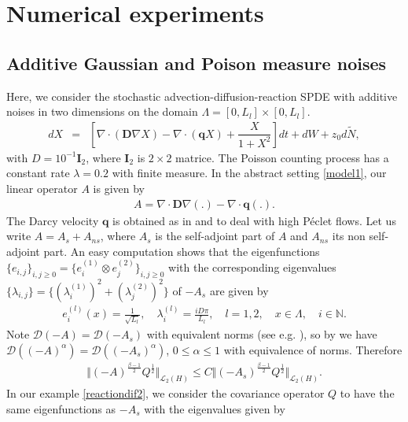 \documentclass[review,12pt]{elsarticle}
\begin{document}
\section{Numerical experiments}
\label{numericalexperiments}

\subsection{Additive Gaussian and Poison measure noises}
Here, we consider  the stochastic advection-diffusion-reaction SPDE with additive  noises in two dimensions on the domain $\Lambda=[0,L_l]\times[0,L_l]$. 
\begin{eqnarray}
\label{reactiondif2}
dX&=&\left[\nabla \cdot (\mathbf{D}\nabla X)-\nabla \cdot(\mathbf{q}X) +\dfrac{X}{1+X^2}\right]dt+dW+z_0d\widetilde{N}, 
\end{eqnarray}
with $D=10^{-1} \mathbf{I}_2$, where $\mathbf{I}_2$ is $2 \times 2$ matrice.  The Poisson counting process has a constant  rate $\lambda=0.2$ with finite measure.
In the abstract setting \eqref{model1}, our linear operator $A$ is given by 
\begin{eqnarray}
 A=\nabla \cdot  \mathbf{D}\nabla (.) -  \nabla \cdot \mathbf{q}(.).
\end{eqnarray}
The Darcy velocity  $\mathbf{q}$ is obtained as in \cite{Antonio1}  and  to deal with high  P\'{e}clet flows.
Let us write $A=A_s+A_{ns}$, where $A_s$ is the self-adjoint part of $A$ and $A_{ns}$ its  non self-adjoint part. An easy computation shows that the eigenfunctions $\{e_{i,j}\}_{i, j\geq 0}=\{e_i^{(1)}\otimes e_j^{(2)}\}_{i,j\geq 0}$ with the corresponding eigenvalues $\{\lambda_{i,j}\}=\{(\lambda_i^{(1)})^2+(\lambda_j^{(2)})^2\}$ of $-A_s$ are given by
\begin{eqnarray}
\label{eigen1}
e_i^{(l)}(x)=\frac{1}{\sqrt{L_l}},\quad \lambda_i^{(l)}=\frac{iD\pi}{L_l},\quad l=1,2,\quad x\in \Lambda,\quad i\in\mathbb{N}.
\end{eqnarray}
Note $\mathcal{D}(-A)=\mathcal{D}(-A_s)$ with equivalent norms (see e.g. \cite{Suzuki}), so by \cite[(3.3)]{Lions} we have $\mathcal{D}((-A)^{\alpha})=\mathcal{D}((-A_s)^{\alpha})$, $0\leq \alpha\leq 1$ with equivalence of norms. Therefore 
\begin{eqnarray}
\label{eigen3}
\Vert (-A)^{\frac{\beta-1}{2}}Q^{\frac{1}{2}}\Vert_{\mathcal{L}_2(H)}\leq C\Vert (-A_s)^{\frac{\beta-1}{2}}Q^{\frac{1}{2}}\Vert_{\mathcal{L}_2(H)}.
\end{eqnarray}
In our example \eqref{reactiondif2}, we consider the covariance operator $Q$ to have the same eigenfunctions as $-A_s$ with the eigenvalues given by
\end{document}

